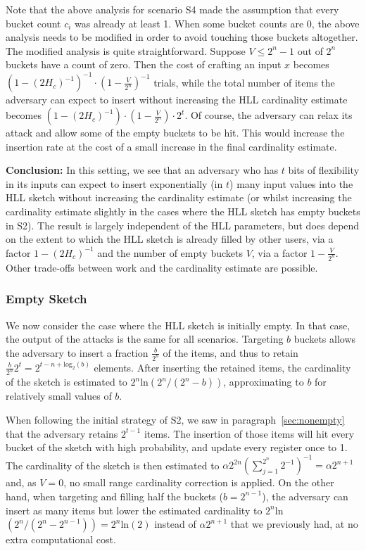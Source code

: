 \documentclass[11pt]{article}
\begin{document}
Note that the above analysis for scenario S4 made the assumption that every bucket count $c_i$ was already at least 1. When some bucket counts are 0, the above analysis needs to be modified in order to avoid touching those buckets altogether. The modified analysis is quite straightforward. Suppose $V \le 2^n-1$ out of $2^n$ buckets have a count of zero. Then the cost of crafting an input $x$ becomes $(1-(2H_c)^{-1})^{-1} \cdot (1- \frac{V}{2^n})^{-1}$ trials, while the total number of items the adversary can expect to insert without increasing the HLL cardinality estimate becomes $(1-(2H_c)^{-1}) \cdot (1- \frac{V}{2^n})\cdot 2^t$. Of course, the adversary can relax its attack and allow some of the empty buckets to be hit. This would increase the insertion rate at the cost of a small increase in the final cardinality estimate. 

\textbf{Conclusion:} In this setting, we see that an adversary who has $t$ bits of flexibility in its inputs can expect to insert exponentially (in $t$) many input values into the HLL sketch without increasing the cardinality estimate (or whilst increasing the cardinality estimate slightly in the cases where the HLL sketch has empty buckets in S2). The result is largely independent of the HLL parameters, but does depend on the extent to which the HLL sketch is already filled by other users, via a factor $1-(2H_c)^{-1}$ and the number of empty buckets $V$, via a factor $1- \frac{V}{2^n}$. Other trade-offs between work and the cardinality estimate are possible.

\subsubsection{Empty Sketch}

We now consider the case where the HLL sketch is initially empty.
In that case, the output of the attacks is the same for all scenarios.
Targeting $b$ buckets allows the adversary to insert a fraction $\frac{b}{2^n}$ of the items, and thus to retain $\frac{b}{2^n}2^t=2^{t-n+\text{log}_2(b)}$ elements.
After inserting the retained items, the cardinality of the sketch is estimated to $2^n$ln$(2^n/(2^n-b))$, approximating to $b$ for relatively small values of $b$.

When following the initial strategy of S2, we saw in paragraph~\ref{sec:nonempty} that the adversary retains $2^{t-1}$ items. The insertion of those items will hit every bucket of the sketch with high probability, and update every register once to 1. The cardinality of the sketch is then estimated to $\alpha2^{2n}(\sum_{j=1}^{2^n}2^{-1})^{-1}=\alpha2^{n+1}$ and, as $V=0$, no small range cardinality correction is applied. 
On the other hand, when targeting and filling half the buckets ($b=2^{n-1}$), the adversary can insert as many items but lower the estimated cardinality to $2^n$ln$(2^n/(2^n-2^{n-1}))=2^n\text{ln}(2)$ instead of $\alpha{2^{n+1}}$ that we previously had, at no extra computational cost.
\end{document}
